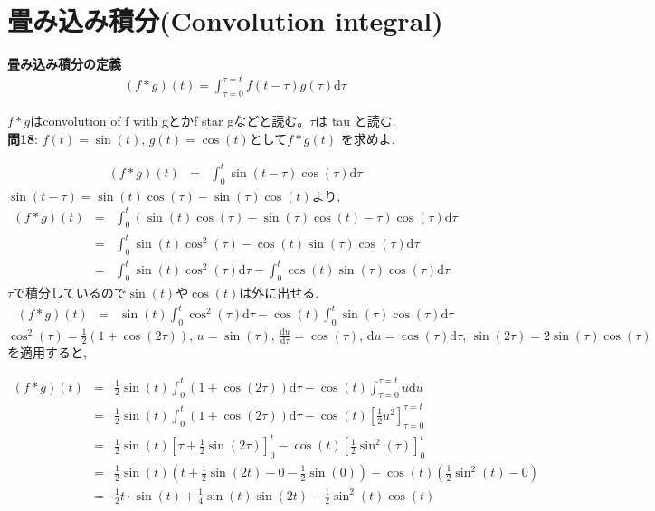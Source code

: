 ﻿\documentclass[a4j]{jarticle}
\begin{document}
\section{畳み込み積分(Convolution integral)}

\begin{itembox}[l]{{\large {\bf 畳み込み積分の定義}}}
\begin{eqnarray*}
(f * g)(t) = \int_{\tau=0}^{\tau=t}{f(t-\tau)g(\tau)\mathrm{d}\tau}
\end{eqnarray*}
\end{itembox}
\( f*g \)はconvolution of f with gとかf star gなどと読む。\( \tau \)は tau と読む. \\

\noindent
{\large {\bf 問18}}: \( f(t)=\sin(t) ,\, g(t)=\cos(t) \text{として} f*g(t) \) を求めよ.

\begin{eqnarray*}
(f*g)(t) &=& \int_0^t{ \sin(t-\tau)\cos(\tau)\mathrm{d}\tau }
\end{eqnarray*}
%
\( \sin(t-\tau)=\sin(t)\cos(\tau)-\sin(\tau)\cos(t) \)より,
%
\begin{eqnarray*}
(f*g)(t) &=& \int_0^t{ (\sin(t)\cos(\tau) - \sin(\tau)\cos(t)-\tau)\cos(\tau)\mathrm{d}\tau } \\
         &=& \int_0^t{ \sin(t)\cos^2(\tau) - \cos(t)\sin(\tau)\cos(\tau)\mathrm{d}\tau } \\
         &=& \int_0^t{ \sin(t)\cos^2(\tau)\mathrm{d}\tau } - \int_0^t{ \cos(t)\sin(\tau)\cos(\tau)\mathrm{d}\tau }
\end{eqnarray*}
\( \tau \)で積分しているので\(\sin(t)\)や\(\cos(t)\)は外に出せる.
\begin{eqnarray*}
(f*g)(t) &=& \sin(t)\int_0^t{ \cos^2(\tau)\mathrm{d}\tau } - \cos(t)\int_0^t{ \sin(\tau)\cos(\tau)\mathrm{d}\tau }
\end{eqnarray*}
%
\( \cos^2(\tau)=\frac{1}{2}(1+\cos(2\tau)) ,\, u=\sin(\tau) ,\, 
\frac{\mathrm{d}u}{\mathrm{d}\tau}=\cos(\tau) ,\, \mathrm{d}u=\cos(\tau)\mathrm{d}\tau ,\, \sin(2\tau)=2\sin(\tau)\cos(\tau) \)を適用すると,

\begin{eqnarray*}
(f*g)(t) &=& \frac{1}{2}\sin(t)\int_0^t{(1+\cos(2\tau))\mathrm{d}\tau} - \cos(t)\int_{\tau=0}^{\tau=t}{u\mathrm{d}u} \\
         &=& \frac{1}{2}\sin(t)\int_0^t{(1+\cos(2\tau))\mathrm{d}\tau} - \cos(t)\left[ \frac{1}{2}u^2 \right]_{\tau=0}^{\tau=t} \\
         &=& \frac{1}{2}\sin(t)\left[ \tau + \frac{1}{2}\sin(2\tau) \right]_0^t - \cos(t) \left[ \frac{1}{2}\sin^2(\tau)\right]_0^t \\
         &=& \frac{1}{2}\sin(t)(t+\frac{1}{2}\sin(2t) - 0 - \frac{1}{2}\sin(0)) - \cos(t)(\frac{1}{2}\sin^2(t) - 0) \\
         &=& \frac{1}{2}t\cdot\sin(t) + \frac{1}{4}\sin(t)\sin(2t) - \frac{1}{2}\sin^2(t)\cos(t) \\
\end{eqnarray*}
\end{document}
